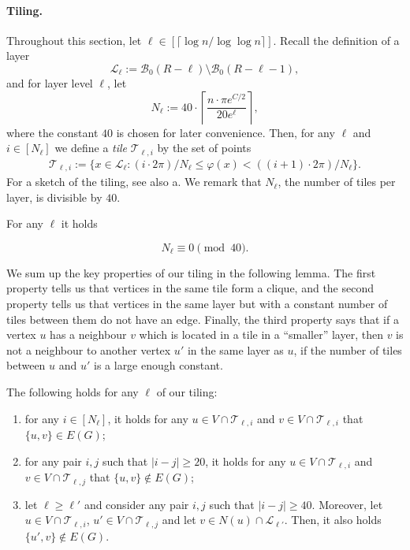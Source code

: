 \documentclass[letterpaper,11pt]{article}
\newcommand{\B}{\mathcal B}
\newcommand{\1}{\mathbb I}
\newcommand{\Layer}[1]{\mathcal{L}_{#1}}
\newcommand{\tiletile}[2]{\mathcal{T}_{#1,#2}}
\begin{document}
\paragraph{Tiling.} Throughout this section, let $\ell \in [\lceil \log n / \log\log n \rceil]$. Recall the definition of a layer $$\Layer{\ell}:= \B_0(R-\ell)\setminus \B_0(R-\ell-1),$$ and for layer level $\ell$, let
%
$$N_\ell := 40\cdot \left\lceil \frac{n \cdot \pi e^{C/2}}{20e^{\ell}}\right\rceil,$$
%
where the constant $40$ is chosen for later convenience.  Then, for any $\ell$ and $i \in [N_\ell]$ we define a \emph{tile} $\tiletile{\ell}{i}$ by the set of points 
%
\begin{align}\label{eq:tile}
    \tiletile{\ell}{i} := \{x \in \Layer{\ell} : (i\cdot 2\pi)/N_{\ell} \leq \varphi(x) < ((i+1)\cdot 2\pi)/N_{\ell} \}.
\end{align}
%
For a sketch of the tiling, see also a. We remark that $N_\ell$, the number of tiles per layer, is divisible by $40$.
%
\begin{remark}\label{rem:divisible}
    For any $\ell$ it holds 

    $$
    N_{\ell} \equiv 0 \pmod{40}.
    $$
\end{remark}
%
We sum up the key properties of our tiling in the following lemma. The first property tells us that vertices in the same tile form a clique, and the second property tells us that vertices in the same layer but with a constant number of tiles between them do not have an edge. Finally, the third property says that if a vertex $u$ has a neighbour $v$ which is located in a tile in a ``smaller'' layer, then $v$ is not a neighbour to another vertex $u'$ in the same layer as $u$, if the number of tiles between $u$ and $u'$ is a large enough constant. 
%
\begin{lemma}\label{lem:tiling}
    The following holds for any $\ell$ of our tiling:

    \begin{enumerate}
  \renewcommand{\labelenumi}{\roman{enumi}.}
  \item\label{item:one} for any $i \in [N_\ell]$, it holds for any $u \in V \cap \tiletile{\ell}{i}$ and $v \in V \cap \tiletile{\ell}{i}$ that $\{u,v\} \in E(G)$;
  \item\label{item:two} for any pair $i, j$ such that $|i-j| \geq 20$, it holds for any $u \in V \cap \tiletile{\ell}{i}$ and $v \in V \cap \tiletile{\ell}{j}$ that $\{u,v\} \not\in E(G)$;
  \item\label{item:three} let $\ell \geq \ell'$ and consider any pair $i,j$ such that $|i-j| \geq 40$. Moreover, let $u \in V \cap \tiletile{\ell}{i}$, $u' \in V \cap \tiletile{\ell}{j}$ and let $v \in N(u) \cap \Layer{\ell'}$. Then, it also holds  $\{u',v\} \not\in E(G)$.
\end{enumerate}
\end{lemma}
\end{document}
